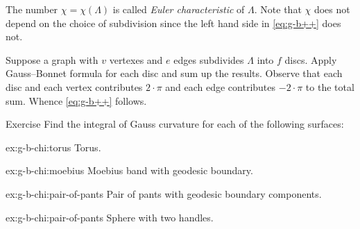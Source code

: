 The number $\chi=\chi(\Lambda)$ is called \emph{Euler characteristic} of $\Lambda$. 
Note that $\chi$ does not depend on the choice of subdivision since the left hand side in \ref{eq:g-b++} does not.

Suppose a graph with $v$ vertexes and $e$ edges subdivides $\Lambda$ into $f$ discs.
Apply Gauss--Bonnet formula for each disc and sum up the results.
Observe that each disc and each vertex contributes $2\cdot\pi$ and each edge contributes $-2\cdot\pi$ to the total sum.
Whence \ref{eq:g-b++} follows.
\qeds



\begin{thm}{Exercise}\label{ex:g-b-chi}
Find the integral of Gauss curvature for each of the following surfaces:

\begin{subthm}{ex:g-b-chi:torus}
Torus.
\end{subthm}

\begin{subthm}{ex:g-b-chi:moebius}
Moebius band with geodesic boundary.
\end{subthm}

\begin{subthm}{ex:g-b-chi:pair-of-pants}
Pair of pants with geodesic boundary components.
\end{subthm}

\begin{subthm}{ex:g-b-chi:pair-of-pants}
Sphere with two handles.
\end{subthm}

\end{thm}

